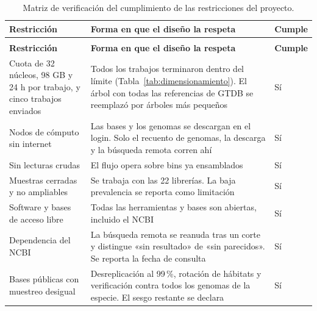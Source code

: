 {\footnotesize
{}
\setlength{\tabcolsep}{4pt}
\begin{xltabular}{\textwidth}{>{\raggedright\arraybackslash}p{3.4cm}>{\raggedright\arraybackslash}X >{\centering\arraybackslash}p{1.1cm}}
\caption[Matriz de verificación de restricciones]{Matriz de verificación del
cumplimiento de las restricciones del proyecto.}
\label{tab:matriz_restricciones} \\
\toprule
\textbf{Restricción} & \textbf{Forma en que el diseño la respeta} & \textbf{Cumple} \\
\midrule
\endfirsthead
{} \\
\toprule
\textbf{Restricción} & \textbf{Forma en que el diseño la respeta} & \textbf{Cumple} \\
\midrule
\endhead
\bottomrule
\endlastfoot
Cuota de 32 núcleos, 98 GB y 24 h por trabajo, y cinco trabajos enviados & Todos los trabajos terminaron dentro del límite (Tabla~\ref{tab:dimensionamiento}). El árbol con todas las referencias de GTDB se reemplazó por árboles más pequeños & Sí \\
Nodos de cómputo sin internet & Las bases y los genomas se descargan en el login. Solo el recuento de genomas, la descarga y la búsqueda remota corren ahí & Sí \\
Sin lecturas crudas & El flujo opera sobre bins ya ensamblados & Sí \\
Muestras cerradas y no ampliables & Se trabaja con las 22 librerías. La baja prevalencia se reporta como limitación & Sí \\
Software y bases de acceso libre & Todas las herramientas y bases son abiertas, incluido el NCBI & Sí \\
Dependencia del NCBI & La búsqueda remota se reanuda tras un corte y distingue «sin resultado» de «sin parecidos». Se reporta la fecha de consulta & Sí \\
Bases públicas con muestreo desigual & Desreplicación al 99\,\%, rotación de hábitats y verificación contra todos los genomas de la especie. El sesgo restante se declara & Sí \\
\end{xltabular}
}
